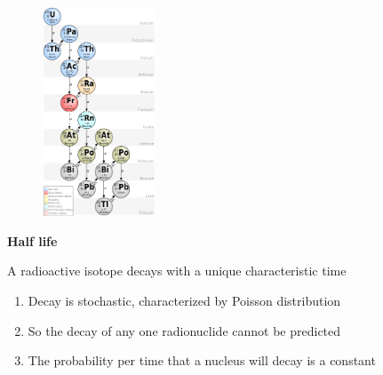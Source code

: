 \documentclass[aspectratio=1610,pdftex,dvipsnames,compress,xcolor={dvipsnames}]{beamer}
\begin{document}
\begin{frame}{}
    \begin{figure}
        \centering
        \includegraphics[width=0.30\textwidth]{u235.chain.jpg}
    \end{figure}
\end{frame}


\begin{frame}[plain]{}
    \centering\LARGE\textbf{Half life}
\end{frame}


\addtocounter{framenumber}{-1}
\begin{frame}{A radioactive isotope decays with a unique characteristic time}
    \begin{enumerate}[series=outerlist,topsep=0pt,itemsep=21pt,leftmargin=*,label=(\arabic*)]
        \item[]Decay is stochastic, characterized by Poisson distribution
        \item[]So the decay of any one radionuclide cannot be predicted
        \item[]The probability per time that a nucleus will decay is a constant
    \end{enumerate}
\end{frame}
\end{document}

